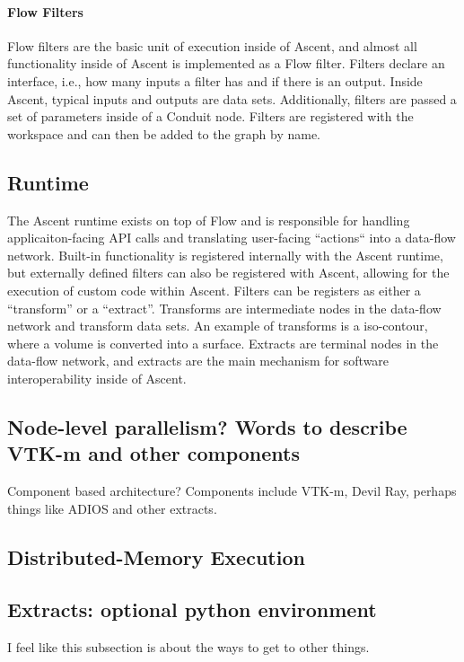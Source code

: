 \paragraph{Flow Filters}
Flow filters are the basic unit of execution inside of Ascent, and
almost all functionality inside of Ascent is implemented as a Flow filter.
%
Filters declare an interface, i.e., how many inputs a filter has and
if there is an output.
%
Inside Ascent, typical inputs and outputs are data sets.
%
Additionally, filters are passed a set of parameters inside of a Conduit
node.
%
Filters are registered with the workspace and can then be added to the
graph by name.


\subsection{Runtime}
The Ascent runtime exists on top of Flow and is responsible for
handling applicaiton-facing API calls and translating user-facing
``actions`` into a data-flow network.
%
Built-in functionality is registered internally with the Ascent runtime,
but externally defined filters can also be registered with Ascent,
allowing for the execution of custom code within Ascent.
%
Filters can be registers as either a ``transform'' or a ``extract''.
%
Transforms are intermediate nodes in the data-flow network and transform
data sets.
%
An example of transforms is a iso-contour, where a volume is converted
into a surface.
%
Extracts are terminal nodes in the data-flow network, and extracts
are the main mechanism for software interoperability inside of Ascent.

\subsection{Node-level parallelism? Words to describe VTK-m and other components}

Component based architecture? Components include VTK-m, Devil Ray, perhaps things like ADIOS and other extracts.

\subsection{Distributed-Memory Execution}

\subsection{Extracts: optional python environment}
I feel like this subsection is about the ways to get to other things.
